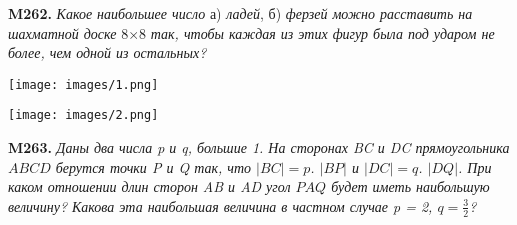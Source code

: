 
\begin{minipage}{.34\textwidth}
    \textbf{M262.}
    \textit{Какое наибольшее число} а) \textit{ладей}, б) \textit{ферзей можно расставить на шахматной доске }8$\times$8\textit{ так, чтобы каждая из этих фигур была под ударом не более, чем одной из остальных?}
    \begin{center}
        \vspace{0.5cm}
        \texttt{[image: images/1.png]}
        \label{fig:8}
        
        \vspace{0.5cm}
        \texttt{[image: images/2.png]}
        \label{fig:9}
    \end{center}

    \textbf{M263.}
    \textit{Даны два числа p и q, большие 1. На сторонах BC и DC прямоугольника $ABCD$ берутся точки P и Q так, что $|BC| = p$. $|BP|$ и $|DC| = q$. $|DQ|$. При каком отношении длин сторон AB и AD угол $PAQ$ будет иметь наибольшую величину? Какова эта наибольшая величина в частном случае p = 2, $q = \frac{3}{2}$?}
\end{minipage}
\hspace{0.5cm}
